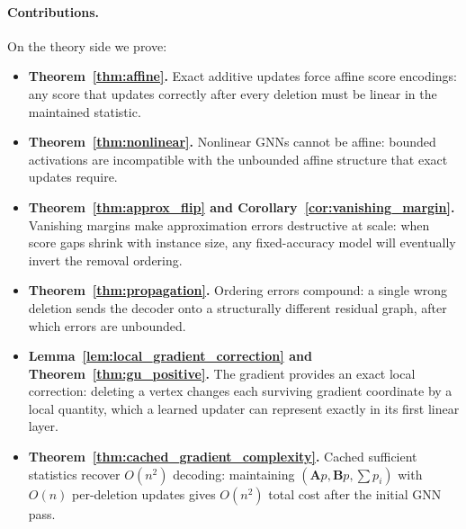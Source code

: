 \documentclass[11pt]{article}
\theoremstyle{plain}
\theoremstyle{remark}
\begin{document}
\paragraph{Contributions.}
On the theory side we prove:
\begin{itemize}
  \item \textbf{Theorem~\ref{thm:affine}.} Exact additive updates force affine score
    encodings: any score that updates correctly after every deletion must be linear
    in the maintained statistic.
  \item \textbf{Theorem~\ref{thm:nonlinear}.} Nonlinear GNNs cannot be affine:
    bounded activations are incompatible with the unbounded affine structure that
    exact updates require.
  \item \textbf{Theorem~\ref{thm:approx_flip} and Corollary~\ref{cor:vanishing_margin}.}
    Vanishing margins make approximation errors destructive at scale: when score gaps
    shrink with instance size, any fixed-accuracy model will eventually invert the
    removal ordering.
  \item \textbf{Theorem~\ref{thm:propagation}.} Ordering errors compound: a single
    wrong deletion sends the decoder onto a structurally different residual graph,
    after which errors are unbounded.
  \item \textbf{Lemma~\ref{lem:local_gradient_correction} and
    Theorem~\ref{thm:gu_positive}.} The gradient provides an exact local correction:
    deleting a vertex changes each surviving gradient coordinate by a local quantity,
    which a learned updater can represent exactly in its first linear layer.
  \item \textbf{Theorem~\ref{thm:cached_gradient_complexity}.} Cached sufficient
    statistics recover $O(n^2)$ decoding: maintaining $(\mathbf{A}p, \mathbf{B}p,
    \sum p_i)$ with $O(n)$ per-deletion updates gives $O(n^2)$ total cost after the
    initial GNN pass.
\end{itemize}
\end{document}
